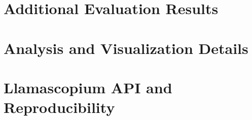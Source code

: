 \documentclass{article}
\begin{document}
\section{Additional Evaluation Results}
\label{app:additional-results}


\section{Analysis and Visualization Details}
\label{app:analysis}


\section{Llamascopium API and Reproducibility}
\label{app:llamascopium}

\end{document}
